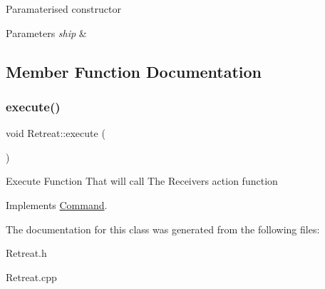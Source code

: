 Paramaterised constructor 
\begin{DoxyParams}{Parameters}
{\em ship} & \\
\hline
\end{DoxyParams}


\subsection{Member Function Documentation}
\mbox{\label{classRetreat_a18fe7bf00ed623de02de5764b9607f5f}} 
\subsubsection{\texorpdfstring{execute()}{execute()}}
{\footnotesize\ttfamily void Retreat\+::execute (\begin{DoxyParamCaption}{ }\end{DoxyParamCaption})\hspace{0.3cm}{\ttfamily [virtual]}}

Execute Function That will call The Receivers action function 

Implements \hyperlink{classCommand_a6fd7d9bd8df8bfc881e4d6c7cd1878b7}{Command}.



The documentation for this class was generated from the following files\+:\begin{DoxyCompactItemize}
\item 
Retreat.\+h\item 
Retreat.\+cpp\end{DoxyCompactItemize}
